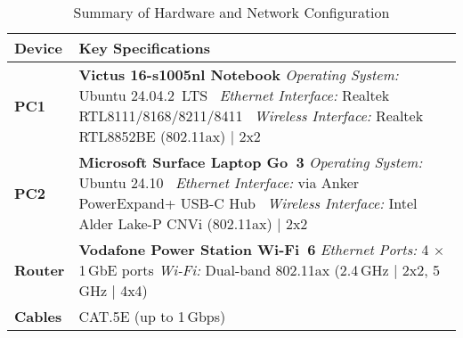         \begin{table}[ht]
            \small
            \centering
            \begin{tabular}{@{}l p{}@{}}
            \toprule
            \textbf{Device} & \textbf{Key Specifications} \\
            \midrule
            \textbf{PC1} 
                & \textbf{Victus 16-s1005nl Notebook} \newline
                \textit{Operating System:}   Ubuntu 24.04.2~LTS~\cite{ubuntu} \newline
                \textit{Ethernet Interface:} Realtek RTL8111/8168/8211/8411~\cite{realtek8111} \newline
                \textit{Wireless Interface:} Realtek RTL8852BE (802.11ax) | 2x2~\cite{realtek8852be} \\
            \midrule
            \textbf{PC2} 
                & \textbf{Microsoft Surface Laptop Go~3} \newline
                \textit{Operating System:}   Ubuntu 24.10~\cite{ubuntu} \newline
                \textit{Ethernet Interface:} via Anker PowerExpand+ USB-C Hub~\cite{ankerhub} \newline
                \textit{Wireless Interface:} Intel Alder Lake-P CNVi (802.11ax) | 2x2~\cite{intelcnvi} \\
            \midrule
            \textbf{Router} 
                & \textbf{Vodafone Power Station Wi-Fi~6} \newline
                \textit{Ethernet Ports:}     4 $\times$ 1\,GbE ports \newline
                \textit{Wi-Fi:}              Dual-band 802.11ax (2.4\,GHz | 2x2, 5\,GHz | 4x4)~\cite{vodafonewifi6} \\
            \midrule
            \textbf{Cables} 
                & CAT.5E (up to 1\,Gbps) \\
            \bottomrule
            \end{tabular}
            \vspace{0.5cm}
            \caption{Summary of Hardware and Network Configuration}
            \label{tab:equipment-summary}
        \end{table}

        \vspace{-0.6cm} %

